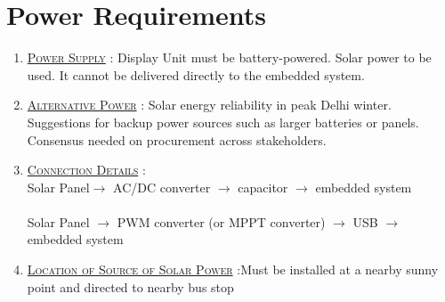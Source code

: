 \section{Power Requirements}

\begin{enumerate}
    \item {}\underline{\textsc{Power Supply}} : Display Unit must be battery-powered. Solar power to be used. It cannot be delivered directly to the \gls{embedded system}.

    \item \underline{\textsc{Alternative Power}} : Solar energy reliability in peak Delhi winter. Suggestions for backup power sources such as larger batteries or panels. Consensus needed on procurement across stakeholders.

    \item \underline{\textsc{Connection Details}} : \\Solar Panel$\to$ AC/\ac{DC} converter $\to$ capacitor $\to$ \gls{embedded system} \\ \\
          Solar Panel $\to$ \gls{PWM converter} (or \gls{MPPT converter}) $\to$ \gls{USB} $\to$ \Gls{embedded system}{\tiny \textcolor{white}{\ac{MPPT}}}

    \item \underline{\textsc{Location of Source of Solar Power}} :Must be installed at a nearby sunny point and directed to nearby bus stop
\end{enumerate}